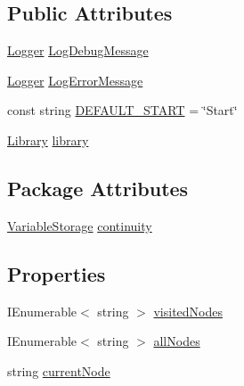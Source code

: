 \subsection*{Public Attributes}
\begin{DoxyCompactItemize}
\item 
\hyperlink{a00026_a1e50031b945a3a2afafee6f590730568}{Logger} \hyperlink{a00036_a381f48bb0fbb294f8cf44ca57f11be31}{Log\-Debug\-Message}
\item 
\hyperlink{a00026_a1e50031b945a3a2afafee6f590730568}{Logger} \hyperlink{a00036_a9801e83dd044d6498fdf6ebcc6bec5ac}{Log\-Error\-Message}
\item 
const string \hyperlink{a00036_a1b643f15f734090e6a58cbf13dafd28f}{D\-E\-F\-A\-U\-L\-T\-\_\-\-S\-T\-A\-R\-T} = \char`\"{}Start\char`\"{}
\item 
\hyperlink{a00049}{Library} \hyperlink{a00036_ae660d4cfb6e296358d2f61d8ee74c66a}{library}
\end{DoxyCompactItemize}
\subsection*{Package Attributes}
\begin{DoxyCompactItemize}
\item 
\hyperlink{a00088}{Variable\-Storage} \hyperlink{a00036_ae94eaa4b03b432422f5d205fabe37ff5}{continuity}
\end{DoxyCompactItemize}
\subsection*{Properties}
\begin{DoxyCompactItemize}
\item 
I\-Enumerable$<$ string $>$ \hyperlink{a00036_ac5661051e0b7f44527fe526c7766dbbf}{visited\-Nodes}
\item 
I\-Enumerable$<$ string $>$ \hyperlink{a00036_a0ee573e3d072bccf98ba1d975612d42c}{all\-Nodes}
\item 
string \hyperlink{a00036_af368b5c342d585dc6953876c5965ccc8}{current\-Node}
\end{DoxyCompactItemize}
